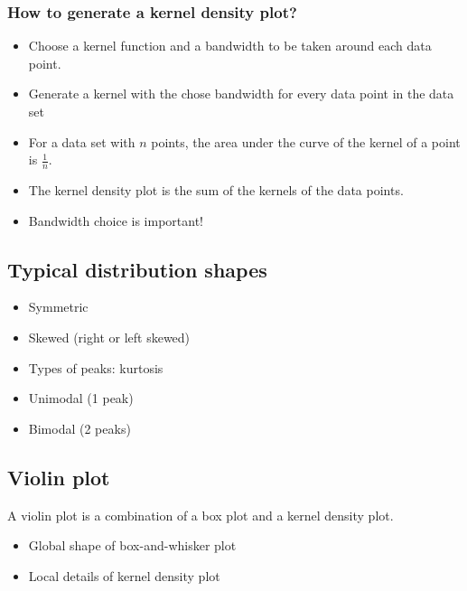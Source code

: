 \subsubsection{How to generate a kernel density plot?}
\begin{itemize}
    \item Choose a kernel function and a bandwidth to be taken around each data point.
    \item Generate a kernel with the chose bandwidth for every data point in the data set
    \item For a data set with $n$ points, the area under the curve of the kernel of a point is $\displaystyle\frac{1}{n}$.
    \item The kernel density plot is the sum of the kernels of the data points.
    \item Bandwidth choice is important!
\end{itemize}

\subsection{Typical distribution shapes}
\begin{itemize}
    \item Symmetric
    \item Skewed (right or left skewed)
    \item Types of peaks: kurtosis 
    \item Unimodal (1 peak)
    \item Bimodal (2 peaks)
\end{itemize}

\subsection{Violin plot}
\begin{definition}
    A violin plot is a combination of a box plot and a kernel density plot.

    \begin{itemize}
        \item Global shape of box-and-whisker plot
        \item Local details of kernel density plot
    \end{itemize}

\end{definition}

